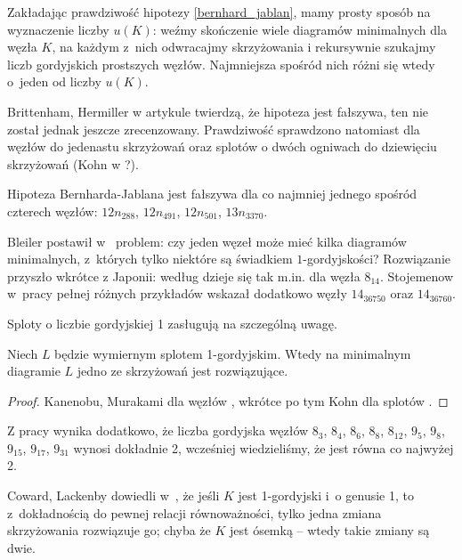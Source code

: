 Zakładając prawdziwość hipotezy \ref{bernhard_jablan}, mamy prosty sposób na wyznaczenie liczby $u(K)$: weźmy skończenie wiele diagramów minimalnych dla węzła $K$, na każdym z~nich odwracajmy skrzyżowania i rekursywnie szukajmy liczb gordyjskich prostszych węzłów.
Najmniejsza spośród nich różni się wtedy o~jeden od liczby $u(K)$.

Brittenham, Hermiller w artykule \cite{brittenham17} twierdzą, że hipoteza jest fałszywa, ten nie został jednak jeszcze zrecenzowany.
Prawdziwość sprawdzono natomiast dla węzłów do jedenastu skrzyżowań oraz splotów o dwóch ogniwach do dziewięciu skrzyżowań (Kohn w \cite{kohn93}?).

\begin{example}
    Hipoteza Bernharda-Jablana jest fałszywa dla co najmniej jednego spośród czterech węzłów: $12n_{288}$, $12n_{491}$, $12n_{501}$, $13n_{3370}$.
\end{example}

Bleiler postawił w~\cite{bleiler84} problem: czy jeden węzeł może mieć kilka diagramów minimalnych, z~których tylko niektóre są świadkiem $1$-gordyjskości?
Rozwiązanie przyszło wkrótce z Japonii: według \cite{kanenobumurakami86} dzieje się tak m.in. dla węzła $8_{14}$.
Stojemenow w~pracy \cite{stoimenow01} pełnej różnych przykładów wskazał dodatkowo węzły $14_{36750}$ oraz $14_{36760}$.

Sploty o liczbie gordyjskiej 1 zasługują na szczególną uwagę.

\begin{proposition}
    Niech $L$ będzie wymiernym splotem 1-gordyjskim.
    Wtedy na minimalnym diagramie $L$ jedno ze skrzyżowań jest rozwiązujące.
\end{proposition}

\begin{proof}
    Kanenobu, Murakami dla węzłów \cite{kanenobumurakami86}, wkrótce po tym Kohn dla splotów \cite{kohn91}.
\end{proof}

Z pracy \cite{kanenobumurakami86} wynika dodatkowo, że liczba gordyjska węzłów $8_{3}$, $8_{4}$, $8_{6}$, $8_{8}$, $8_{12}$, $9_{5}$, $9_{8}$, $9_{15}$, $9_{17}$, $9_{31}$ wynosi dokładnie 2, wcześniej wiedzieliśmy, że jest równa co najwyżej 2. 

Coward, Lackenby dowiedli w~\cite{coward11}, że jeśli $K$ jest 1-gordyjski i~o genusie 1, to z~dokładnością do pewnej relacji równoważności, tylko jedna zmiana skrzyżowania rozwiązuje go; chyba że $K$ jest ósemką -- wtedy takie zmiany są dwie.

